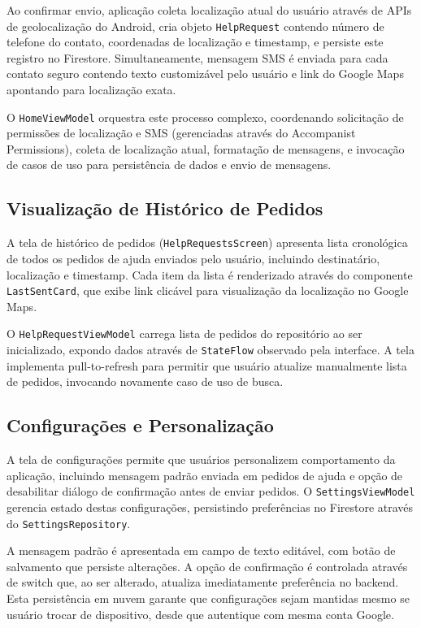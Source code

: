 Ao confirmar envio, aplicação coleta localização atual do usuário através de APIs de geolocalização do Android, cria objeto \texttt{HelpRequest} contendo número de telefone do contato, coordenadas de localização e timestamp, e persiste este registro no Firestore. Simultaneamente, mensagem SMS é enviada para cada contato seguro contendo texto customizável pelo usuário e link do Google Maps apontando para localização exata.

O \texttt{HomeViewModel} orquestra este processo complexo, coordenando solicitação de permissões de localização e SMS (gerenciadas através do Accompanist Permissions), coleta de localização atual, formatação de mensagens, e invocação de casos de uso para persistência de dados e envio de mensagens.

\subsection{Visualização de Histórico de Pedidos}
A tela de histórico de pedidos (\texttt{HelpRequestsScreen}) apresenta lista cronológica de todos os pedidos de ajuda enviados pelo usuário, incluindo destinatário, localização e timestamp. Cada item da lista é renderizado através do componente \texttt{LastSentCard}, que exibe link clicável para visualização da localização no Google Maps.

O \texttt{HelpRequestViewModel} carrega lista de pedidos do repositório ao ser inicializado, expondo dados através de \texttt{StateFlow} observado pela interface. A tela implementa pull-to-refresh para permitir que usuário atualize manualmente lista de pedidos, invocando novamente caso de uso de busca.

\subsection{Configurações e Personalização}
A tela de configurações permite que usuários personalizem comportamento da aplicação, incluindo mensagem padrão enviada em pedidos de ajuda e opção de desabilitar diálogo de confirmação antes de enviar pedidos. O \texttt{SettingsViewModel} gerencia estado destas configurações, persistindo preferências no Firestore através do \texttt{SettingsRepository}.

A mensagem padrão é apresentada em campo de texto editável, com botão de salvamento que persiste alterações. A opção de confirmação é controlada através de switch que, ao ser alterado, atualiza imediatamente preferência no backend. Esta persistência em nuvem garante que configurações sejam mantidas mesmo se usuário trocar de dispositivo, desde que autentique com mesma conta Google.


